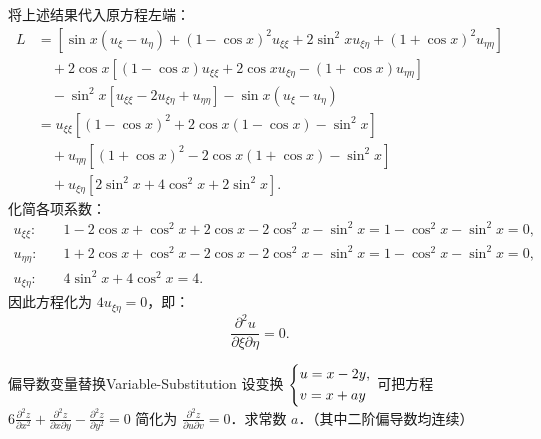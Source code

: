 \begin{myproof}
    将上述结果代入原方程左端：
    \begin{equation}
        \begin{aligned}
            L & = \left[ \sin x (u_\xi - u_\eta) + (1 - \cos x)^2 u_{\xi\xi} + 2\sin^2 x u_{\xi\eta} + (1 + \cos x)^2 u_{\eta\eta} \right] \\
              & \quad + 2\cos x \left[ (1 - \cos x) u_{\xi\xi} + 2\cos x u_{\xi\eta} - (1 + \cos x) u_{\eta\eta} \right]                   \\
              & \quad - \sin^2 x \left[ u_{\xi\xi} - 2u_{\xi\eta} + u_{\eta\eta} \right] - \sin x (u_\xi - u_\eta)                         \\
              & = u_{\xi\xi} \left[ (1 - \cos x)^2 + 2\cos x (1 - \cos x) - \sin^2 x \right]                                               \\
              & \quad + u_{\eta\eta} \left[ (1 + \cos x)^2 - 2\cos x (1 + \cos x) - \sin^2 x \right]                                       \\
              & \quad + u_{\xi\eta} \left[ 2\sin^2 x + 4\cos^2 x + 2\sin^2 x \right].
        \end{aligned}
    \end{equation}
    化简各项系数：
    \begin{equation}
        \begin{aligned}
            u_{\xi\xi}: \quad   & 1 - 2\cos x + \cos^2 x + 2\cos x - 2\cos^2 x - \sin^2 x = 1 - \cos^2 x - \sin^2 x = 0, \\
            u_{\eta\eta}: \quad & 1 + 2\cos x + \cos^2 x - 2\cos x - 2\cos^2 x - \sin^2 x = 1 - \cos^2 x - \sin^2 x = 0, \\
            u_{\xi\eta}: \quad  & 4\sin^2 x + 4\cos^2 x = 4.
        \end{aligned}
    \end{equation}
    因此方程化为 $4 u_{\xi\eta} = 0$，即：
    \begin{equation}
        \frac{\partial^2 u}{\partial \xi \partial \eta} = 0.
    \end{equation}
\end{myproof}


\begin{problem}{偏导数变量替换}{Variable-Substitution}
    设变换 $\begin{dcases} u = x - 2y, \\ v = x + ay \end{dcases}$ 可把方程 $6 \frac{\partial^2 z}{\partial x^2} + \frac{\partial^2 z}{\partial x \partial y} - \frac{\partial^2 z}{\partial y^2} = 0$ 简化为 $\frac{\partial^2 z}{\partial u \partial v} = 0$．求常数 $a$．（其中二阶偏导数均连续）
\end{problem}


